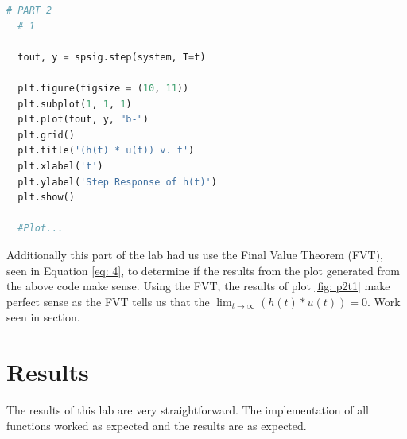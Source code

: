 \documentclass[12pt]{report}
\begin{document}
\begin{lstlisting}[language=Python, basicstyle=\footnotesize]
  # PART 2
  # 1

  tout, y = spsig.step(system, T=t)

  plt.figure(figsize = (10, 11))
  plt.subplot(1, 1, 1)
  plt.plot(tout, y, "b-")
  plt.grid()
  plt.title('(h(t) * u(t)) v. t')
  plt.xlabel('t')
  plt.ylabel('Step Response of h(t)')
  plt.show()

  #Plot...
\end{lstlisting}

Additionally this part of the lab had us use the Final Value Theorem (FVT), seen in Equation \eqref{eq: 4}, to determine if the results from the plot generated from the above code make sense.
Using the FVT, the results of plot \ref{fig: p2t1} make perfect sense as the FVT tells us that the $\lim_{t\to\infty}(h(t)*u(t)) = 0$. Work seen in  section.

\section{Results}\label{section: Results}
The results of this lab are very straightforward. The implementation of all functions worked as expected and the results are as expected.
\end{document}
